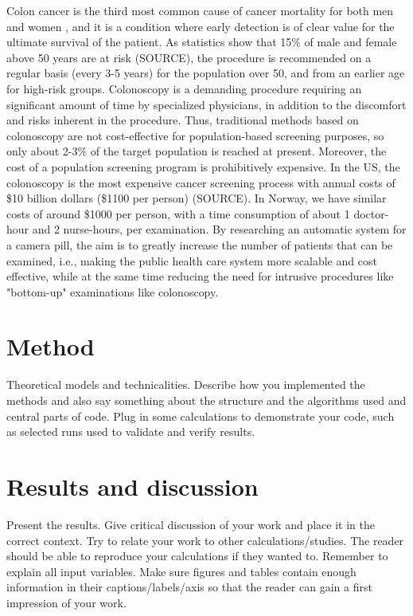 \documentclass[english, a4paper]{report}
\begin{document}
Colon cancer is the third most common cause of cancer mortality for both men and women \cite{CancerStatistics10}, and it is a condition where early detection is of clear value for the ultimate survival of the patient. As statistics show that 15\% of male and female above 50 years are at risk (SOURCE), the procedure is recommended on a regular basis (every 3-5 years) for the population over 50, and from an earlier age for high-risk groups. Colonoscopy is a demanding procedure requiring an significant amount of time by specialized physicians, in addition to the discomfort and risks inherent in the procedure. Thus, traditional methods based on colonoscopy are not cost-effective for population-based screening purposes, so only about 2-3\% of the target population is reached at present. Moreover, the cost of a population screening program is prohibitively expensive. In the US, the colonoscopy is the most expensive cancer screening process with annual costs of \$10 billion dollars (\$1100 per person) (SOURCE). In Norway, we have similar costs of around \$1000 per person, with a time consumption of about 1 doctor-hour and 2 nurse-hours, per examination. By researching an automatic system for a camera pill, the aim is to greatly increase the number of patients that can be examined, i.e., making the public health care system more scalable and cost effective, while at the same time reducing the need for intrusive procedures like "bottom-up" examinations like colonoscopy.





\section{Method}
Theoretical models and technicalities. Describe how you implemented the methods and also say something about the structure and the algorithms used and central parts of code. Plug in some calculations to demonstrate your code, such as selected runs used to validate and verify results.




\section{Results and discussion}
Present the results. Give critical discussion of your work and place it in the correct context. Try to relate your work to other calculations/studies. The reader should be able to reproduce your calculations if they wanted to. Remember to explain all input variables. Make sure figures and tables contain enough information in their captions/labels/axis so that the reader can gain a first impression of your work.
\end{document}
